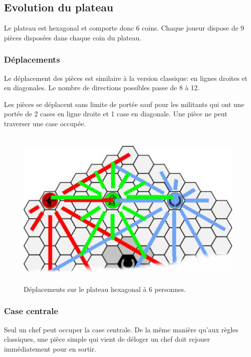 \documentclass{article}
\begin{document}
\newpage

\vspace{30pt}

\subsection{Evolution du plateau}

Le plateau est hexagonal et comporte donc 6 coins. Chaque joueur dispose de 9 pièces disposées dans chaque coin du plateau.

\subsubsection{Déplacements}

Le déplacement des pièces est similaire à la version classique: en lignes droites et en diagonales. Le nombre de directions possibles passe de 8 à 12.

Les pièces se déplacent sans limite de portée sauf pour les militants qui ont une portée de 2 cases en ligne droite et 1 case en diagonale.
Une pièce ne peut traverser une case occupée.

\vspace{10pt}

\begin{figure}[ht]
\centering
\includegraphics[width=5in,height=3.1in]{media/dja_6_01.png}
\caption{Déplacements sur le plateau hexagonal à 6 personnes.}
\end{figure}

\subsubsection{Case centrale}

Seul un chef peut occuper la case centrale. De la même manière qu'aux règles classiques, une pièce simple qui vient de déloger un chef doit rejouer immédiatement pour en sortir.
\end{document}
